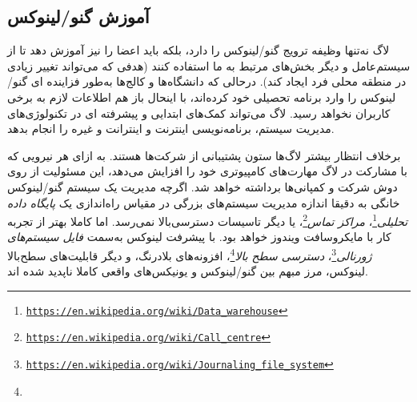 \subsection{آموزش گنو/لینوکس}

لاگ نه‌تنها وظیفه ترویج گنو/لینوکس را دارد، بلکه باید اعضا را نیز آموزش دهد
تا از سیستم‌عامل و دیگر بخش‌های مرتبط به ما استفاده کنند (هدفی که می‌تواند
تغییر زیادی در منطقه محلی فرد ایجاد کند). 
درحالی که دانشگاه‌ها و کالج‌ها به‌طور فزاینده ای گنو/لینوکس را
وارد برنامه تحصیلی خود کرده‌اند، با اینحال باز هم اطلاعات لازم به برخی کاربران نخواهد رسید.
لاگ می‌تواند کمک‌های ابتدایی و پیشرفته ای در تکنولوژی‌های مدیریت سیستم، برنامه‌نویسی
اینترنت و اینترانت و غیره را انجام بدهد.

برخلاف انتظار بیشتر لاگ‌ها ستون پشتیبانی از شرکت‌ها هستند.
به ازای هر نیرویی که با مشارکت در لاگ مهارت‌های کامپیوتری خود را
افزایش می‌دهد، این مسئولیت از روی دوش شرکت و کمپانی‌ها برداشته خواهد شد.
اگرچه مدیریت یک سیستم گنو/لینوکس خانگی به دقیقا اندازه مدیریت سیستم‌های
بزرگی در مقیاس راه‌اندازی یک
\emph{پایگاه داده تحلیلی}\footnote{\texttt{\url{https://en.wikipedia.org/wiki/Data_warehouse}}}،
\emph{مراکز تماس}\footnote{\texttt{\url{https://en.wikipedia.org/wiki/Call_centre}}}،
یا دیگر تاسیسات دسترسی‌بالا نمی‌رسد. اما کاملا بهتر از تجربه کار با
مایکروسافت ویندوز خواهد بود.
با پیشرفت لینوکس به‌سمت
\emph{فایل سیستم‌های ژورنالی}\footnote{\texttt{\url{https://en.wikipedia.org/wiki/Journaling_file_system}}}،
\emph{دسترسی سطح بالا}\footnote{}،
افزونه‌های بلادرنگ، و دیگر قابلیت‌های سطح‌بالا لینوکس،
مرز مبهم بین گنو/لینوکس و یونیکس‌های واقعی کاملا ناپدید شده اند.

